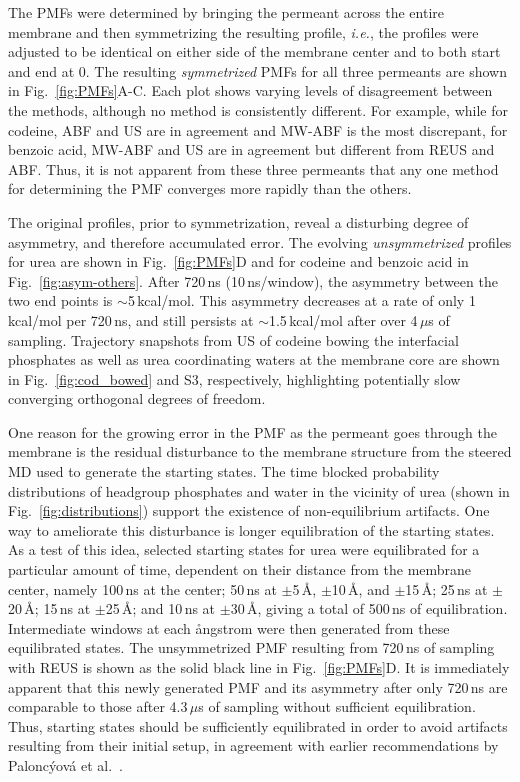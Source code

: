 \par The PMFs were determined by bringing the permeant across the entire membrane and then symmetrizing the resulting profile, {\it i.e.}, the profiles were adjusted to be identical on either side of the membrane center and to both start and end at 0.  The resulting {\it symmetrized} PMFs for all three permeants are shown in Fig.~\ref{fig:PMFs}A-C.  Each plot shows varying levels of disagreement between the methods, although no method is consistently different.  For example, while for codeine, ABF and US are in agreement and MW-ABF is the most discrepant, for benzoic acid, MW-ABF and US are in agreement but different from REUS and ABF.  Thus, it is not apparent from these three permeants that any one method for determining the PMF converges more rapidly than the others.

\par The original profiles, prior to symmetrization, reveal a disturbing degree of asymmetry, and therefore accumulated error.  The evolving {\it unsymmetrized} profiles for urea are shown in Fig.~\ref{fig:PMFs}D and for codeine and benzoic acid in Fig.~\ref{fig:asym-others}.  After 720\,ns (10\,ns/window), the asymmetry between the two end points is $\sim$5\,kcal/mol.  This asymmetry decreases at a rate of only 1\,kcal/mol per 720\,ns, and still persists at $\sim$1.5\,kcal/mol after over 4\,$\mu$s of sampling. Trajectory snapshots from US of codeine bowing the interfacial phosphates as well as urea coordinating waters at the membrane core are shown in Fig.~\ref{fig:cod_bowed} and S3, respectively, highlighting potentially slow converging orthogonal degrees of freedom.

\par One reason for the growing error in the PMF as the permeant goes through the membrane is the residual disturbance to the membrane structure from the steered MD used to generate the starting states. The time blocked probability distributions of headgroup phosphates and water in the vicinity of urea (shown in Fig.~\ref{fig:distributions}) support the existence of non-equilibrium artifacts. One way to ameliorate this disturbance is longer equilibration of the starting states.  As a test of this idea, selected starting states for urea were equilibrated for a particular amount of time, dependent on their distance from the membrane center, namely 100\,ns at the center; 50\,ns at
$\pm$5\,\AA, $\pm$10\,\AA, and $\pm$15\,\AA; 25\,ns at $\pm$20\,\AA; 15\,ns at $\pm$25\,\AA; and 10\,ns at $\pm$30\,\AA,
giving a total of 500\,ns of equilibration.  Intermediate windows at each \aa ngstrom were then generated from these equilibrated states.  The unsymmetrized PMF resulting from 720\,ns of sampling with REUS is shown as the solid black line in Fig.~\ref{fig:PMFs}D.  It is immediately apparent that this newly generated PMF and its asymmetry after only 720\,ns are comparable to those after 4.3\,$\mu$s of sampling without sufficient equilibration.
Thus,
starting states should be sufficiently equilibrated in order to avoid artifacts resulting from their initial setup, in agreement with earlier recommendations by Palonc{\'{y}}ov{\'{a}} et al.~\cite{Paloncyova2012}.



